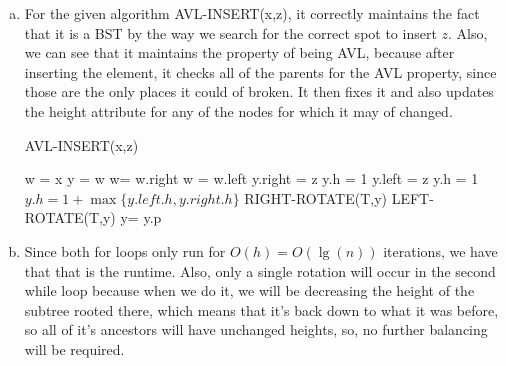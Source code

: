 \documentclass{article}
\begin{document}
\begin{enumerate}[a.]
\item
For the given algorithm AVL-INSERT(x,z), it correctly maintains the fact that it is a BST by the way we search for the correct spot to insert $z$. Also, we can see that it maintains the property of being AVL, because after inserting the element, it checks all of the parents for the AVL property, since those are the only places it could of broken. It then fixes it and also updates the height attribute for any of the nodes for which it may of changed.
\begin{algorithm}
\caption{AVL-INSERT(x,z)}
\begin{algorithmic}
\State w = x
\State y = w
\State w= w.right
\Else
\State w = w.left
\EndIf
\EndWhile
\State
{}
\State y.right = z
\State y.h = 1
\EndIf
\Else
\State y.left = z
\State y.h = 1
\EndIf
\EndIf
{}
\State $y.h = 1 + \max\{y.left.h,y.right.h\}$
\State RIGHT-ROTATE(T,y)
\EndIf
{}
\State LEFT-ROTATE(T,y)
\State y= y.p
\EndIf
\EndWhile
\end{algorithmic}
\end{algorithm}

\item
Since both for loops only run for $O(h) = O(\lg(n))$ iterations, we have that that is the runtime. Also, only a single rotation will occur in the second while loop because when we do it, we will be decreasing the height of the subtree rooted there, which means that it's back down to what it was before, so all of it's ancestors will have unchanged heights, so, no further balancing will be required.


\end{enumerate}
\end{document}
